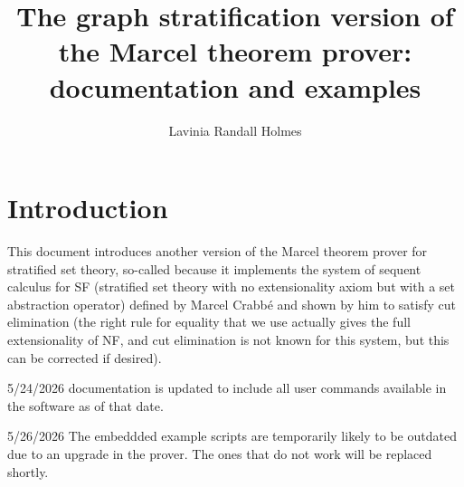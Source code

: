 \documentclass[12pt]{article}
\title{The graph stratification version of the Marcel theorem
prover: documentation and examples}
\author{Lavinia Randall Holmes}
\begin{document}
\maketitle
\tableofcontents

\section{Introduction}

This document introduces another version of the Marcel theorem
prover for stratified set theory, so-called because it
implements the system of sequent calculus for SF (stratified set
theory with no extensionality axiom but with a set abstraction
operator) defined by Marcel Crabb\'e and shown by him to satisfy
cut elimination (the right rule for equality that we use actually gives the full extensionality of NF, and cut elimination is not known for this system, but this can be corrected if desired).

5/24/2026  documentation is updated to include all user commands available in the software as of that date.

5/26/2026  The embeddded example scripts are temporarily likely to be outdated due to an upgrade in the prover.  The ones that do not work
will be replaced shortly.
\end{document}
